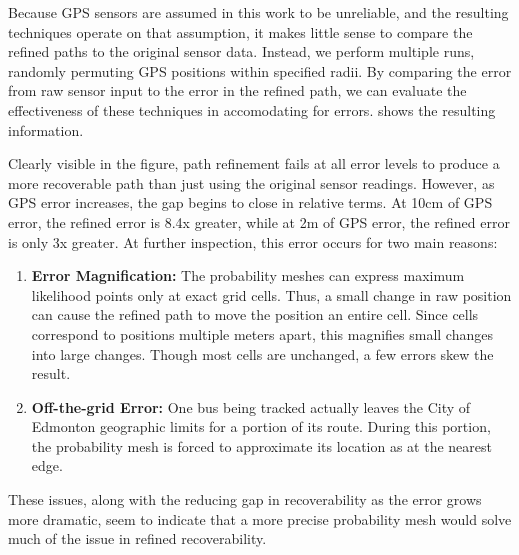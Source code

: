 Because GPS sensors are assumed in this work to be unreliable, and the resulting techniques operate on that assumption, it makes little sense to compare the refined paths to the original sensor data. Instead, we perform multiple runs, randomly permuting GPS positions within specified radii. By comparing the error from raw sensor input to the error in the refined path, we can evaluate the effectiveness of these techniques in accomodating for errors.  shows the resulting information.



Clearly visible in the figure, path refinement fails at all error levels to produce a more recoverable path than just using the original sensor readings. However, as GPS error increases, the gap begins to close in relative terms. At 10cm of GPS error, the refined error is 8.4x greater, while at 2m of GPS error, the refined error is only 3x greater. At further inspection, this error occurs for two main reasons:
\begin{enumerate}
    \item \textbf{Error Magnification:} The probability meshes can express maximum likelihood points only at exact grid cells. Thus, a small change in raw position can cause the refined path to move the position an entire cell. Since cells correspond to positions multiple meters apart, this magnifies small changes into large changes. Though most cells are unchanged, a few errors skew the result.

    \item \textbf{Off-the-grid Error:} One bus being tracked actually leaves the City of Edmonton geographic limits for a portion of its route. During this portion, the probability mesh is forced to approximate its location as at the nearest edge.
\end{enumerate}

These issues, along with the reducing gap in recoverability as the error grows more dramatic, seem to indicate that a more precise probability mesh would solve much of the issue in refined recoverability.

%
%
%
